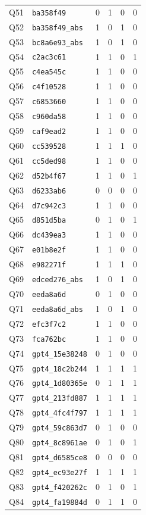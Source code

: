 \begin{longtable}{@{}clcccc@{}}
Q51 & \texttt{ba358f49} & 0 & 1 & 0 & 0 \\
Q52 & \texttt{ba358f49\_abs} & 1 & 0 & 1 & 0 \\
Q53 & \texttt{bc8a6e93\_abs} & 1 & 0 & 1 & 0 \\
Q54 & \texttt{c2ac3c61} & 1 & 1 & 0 & 1 \\
Q55 & \texttt{c4ea545c} & 1 & 1 & 0 & 0 \\
Q56 & \texttt{c4f10528} & 1 & 1 & 0 & 0 \\
Q57 & \texttt{c6853660} & 1 & 1 & 0 & 0 \\
Q58 & \texttt{c960da58} & 1 & 1 & 0 & 0 \\
Q59 & \texttt{caf9ead2} & 1 & 1 & 0 & 0 \\
Q60 & \texttt{cc539528} & 1 & 1 & 1 & 0 \\
Q61 & \texttt{cc5ded98} & 1 & 1 & 0 & 0 \\
Q62 & \texttt{d52b4f67} & 1 & 1 & 0 & 1 \\
Q63 & \texttt{d6233ab6} & 0 & 0 & 0 & 0 \\
Q64 & \texttt{d7c942c3} & 1 & 1 & 0 & 0 \\
Q65 & \texttt{d851d5ba} & 0 & 1 & 0 & 1 \\
Q66 & \texttt{dc439ea3} & 1 & 1 & 0 & 0 \\
Q67 & \texttt{e01b8e2f} & 1 & 1 & 0 & 0 \\
Q68 & \texttt{e982271f} & 1 & 1 & 1 & 0 \\
Q69 & \texttt{edced276\_abs} & 1 & 0 & 1 & 0 \\
Q70 & \texttt{eeda8a6d} & 0 & 1 & 0 & 0 \\
Q71 & \texttt{eeda8a6d\_abs} & 1 & 0 & 1 & 0 \\
Q72 & \texttt{efc3f7c2} & 1 & 1 & 0 & 0 \\
Q73 & \texttt{fca762bc} & 1 & 1 & 0 & 0 \\
Q74 & \texttt{gpt4\_15e38248} & 0 & 1 & 0 & 0 \\
Q75 & \texttt{gpt4\_18c2b244} & 1 & 1 & 1 & 1 \\
Q76 & \texttt{gpt4\_1d80365e} & 0 & 1 & 1 & 1 \\
Q77 & \texttt{gpt4\_213fd887} & 1 & 1 & 1 & 1 \\
Q78 & \texttt{gpt4\_4fc4f797} & 1 & 1 & 1 & 1 \\
Q79 & \texttt{gpt4\_59c863d7} & 0 & 1 & 0 & 0 \\
Q80 & \texttt{gpt4\_8c8961ae} & 0 & 1 & 0 & 1 \\
Q81 & \texttt{gpt4\_d6585ce8} & 0 & 0 & 0 & 0 \\
Q82 & \texttt{gpt4\_ec93e27f} & 1 & 1 & 1 & 1 \\
Q83 & \texttt{gpt4\_f420262c} & 0 & 1 & 0 & 1 \\
Q84 & \texttt{gpt4\_fa19884d} & 0 & 1 & 1 & 0 \\
\end{longtable}

